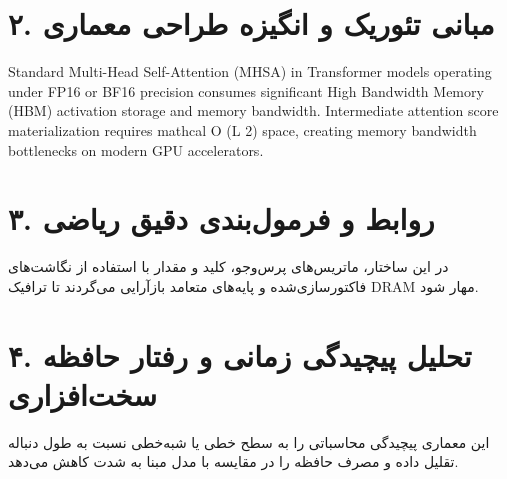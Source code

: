 \documentclass[12pt,a4paper]{article}
\begin{document}
\section*{۲. مبانی تئوریک و انگیزه طراحی معماری}
Standard Multi-Head Self-Attention (MHSA) in Transformer models operating under FP16 or BF16 precision consumes significant High Bandwidth Memory (HBM) activation storage and memory bandwidth. Intermediate attention score materialization requires mathcal O (L 2) space, creating memory bandwidth bottlenecks on modern GPU accelerators.

\section*{۳. روابط و فرمول‌بندی دقیق ریاضی}
در این ساختار، ماتریس‌های پرس‌وجو، کلید و مقدار با استفاده از نگاشت‌های فاکتورسازی‌شده و پایه‌های متعامد بازآرایی می‌گردند تا ترافیک DRAM مهار شود.

\section*{۴. تحلیل پیچیدگی زمانی و رفتار حافظه سخت‌افزاری}
این معماری پیچیدگی محاسباتی را به سطح خطی یا شبه‌خطی نسبت به طول دنباله تقلیل داده و مصرف حافظه را در مقایسه با مدل مبنا به شدت کاهش می‌دهد.
\end{document}
